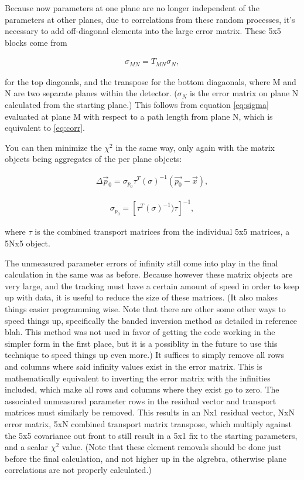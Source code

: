     Because now parameters at one plane are no longer independent of the parameters at other planes, due to correlations from these random processes, it's necessary to add off-diagonal elements into the large error matrix. These 5x5 blocks come from 

\begin{align} \label{eq:corr}
\sigma_{MN} = T_{MN} \sigma_{N}, 
\end{align}

    for the top diagonals, and the transpose for the bottom diagaonals, where M and N are two separate planes within the detector. ($\sigma_{N}$ is the error matrix on plane N calculated from the starting plane.) This follows from equation \ref{eq:sigma} evaluated at plane M with respect to a path length from plane N, which is equivalent to \ref{eq:corr}. 

    You can then minimize the $\chi^{2}$ in the same way, only again with the matrix objects being aggregates of the per plane objects:

\begin{align} \label{eq:deltafull}
\Delta \vec{p}_{0} = \sigma_{p_{0}} \tau^{T}(\sigma)^{-1}(\vec{p_{0}}-\vec{x}),
\end{align}

\begin{align} \label{eq:covfull}
\sigma_{p_{0}} = [\tau^{T} (\sigma)^{-1}) \tau ]^{-1},
\end{align}

    where $\tau$ is the combined transport matrices from the individual 5x5 matrices, a 5Nx5 object.

    The unmeasured parameter errors of infinity still come into play in the final calculation in the same was as before. Because however these matrix objects are very large, and the tracking must have a certain amount of speed in order to keep up with data, it is useful to reduce the size of these matrices. (It also makes things easier programming wise. Note that there are other some other ways to speed things up, specifically the banded inversion method as detailed in reference blah. This method was not used in favor of getting the code working in the simpler form in the first place, but it is a possiblity in the future to use this technique to speed things up even more.) It suffices to simply remove all rows and columns where said infinity values exist in the error matrix. This is mathematically equivalent to inverting the error matrix with the infinities included, which make all rows and columns where they exist go to zero. The associated unmeasured parameter rows in the residual vector and transport matrices must similarly be removed. This results in an Nx1 residual vector, NxN error matrix, 5xN combined transport matrix transpose, which multiply against the 5x5 covariance out front to still result in a 5x1 fix to the starting parameters, and a scalar $\chi^2$ value. (Note that these element removals should be done just before the final calculation, and not higher up in the algrebra, otherwise plane correlations are not properly calculated.)


